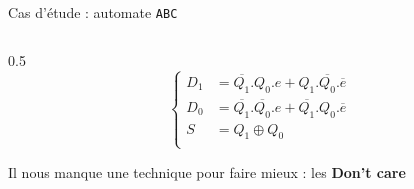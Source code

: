 \begin{frame}{Cas d'étude : automate \texttt{ABC}}
\begin{columns}
\begin{column}{0.5\textwidth}
            \[
              \left\{
              \begin{aligned}
              D_1 &= \overline{Q_1}.Q_0.e+Q_1.\overline{Q_0}.\overline{e}\\
              D_0 &= \overline{Q_1}.\overline{Q_0}.e + \overline{Q_1}.Q_0.\overline{e}\\
              S   &= Q_1 \oplus Q_0\\
              \end{aligned}
              \right.
            \]

            Il nous manque une technique pour faire mieux : les \textbf{Don't care}
        \end{column}
    \end{columns}
\end{frame}

